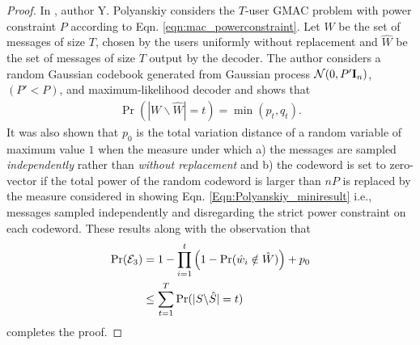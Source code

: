 \begin{proof}
In \cite{polyanskiy2017perspective}, author Y. Polyanskiy considers the $T$-user GMAC problem with power constraint $P$ according to Eqn. \eqref{eqn:mac_powerconstraint}. Let $W$ be the set of messages of size $T$, chosen by the users uniformly without replacement and $\hat{W}$ be the set of messages of size $T$ output by the decoder. The author considers a random Gaussian codebook generated from Gaussian process $\mathcal{N}(0,P'\mathbf{I}_n)$,  $(P'<P)$, and maximum-likelihood decoder and shows that
\begin{align}
\Pr(|W\backslash \hat{W}|=t)=\min(p_t,q_t).
\label{Eqn:Polyanskiy_miniresult}
\end{align}
It was also shown that $p_0$ is the total variation distance of a random variable of maximum value $1$ when the measure under which a) the messages are sampled \textit{independently} rather than \textit{without replacement} and b) the codeword is set to zero-vector if the total power of the random codeword is larger than $nP$ is replaced by the measure considered in showing Eqn. \eqref{Eqn:Polyanskiy_miniresult} i.e., messages sampled independently and disregarding the strict power constraint on each codeword. These results along with the observation that
\begin{align*}
\mathrm{Pr}(\mathcal{E}_3)&=1-\prod_{i=1}^{t}\left(1-\mathrm{Pr}(\hat{w}_i\notin\hat{W})\right)+p_0\\
					&\leq\sum_{t=1}^{T} \mathrm{Pr}(|S\backslash\hat{S}|=t)
\end{align*}
completes the proof.
\end{proof}

